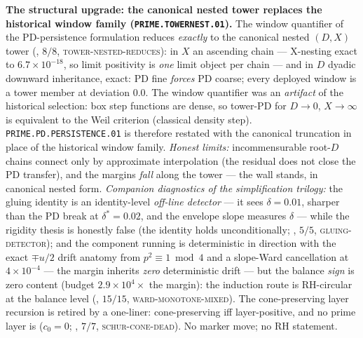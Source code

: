\par\smallskip\noindent\textbf{The structural upgrade: the canonical
nested tower replaces the historical window family
(\texttt{PRIME.TOWERNEST.01}).}
The window quantifier of the PD-persistence formulation reduces
\emph{exactly} to the canonical nested $(D,X)$ tower
(, $8/8$,
\textsc{tower-nested-reduces}): in $X$ an ascending chain ---
X-nesting exact to $6.7\times10^{-18}$, so limit positivity is
\emph{one} limit object per chain --- and in $D$ dyadic downward
inheritance, exact: PD fine \emph{forces} PD coarse; every deployed
window is a tower member at deviation $0.0$.  The window quantifier
was an \emph{artifact} of the historical selection: box step
functions are dense, so tower-PD for $D\to0$, $X\to\infty$ is
equivalent to the Weil criterion (classical density step).
\texttt{PRIME.PD.PERSISTENCE.01} is therefore restated with the
canonical truncation in place of the historical window family.
\emph{Honest limits:} incommensurable root-$D$ chains connect only
by approximate interpolation (the residual does not close the PD
transfer), and the margins \emph{fall} along the tower --- the wall
stands, in canonical nested form.  \emph{Companion diagnostics of
the simplification trilogy:} the gluing identity is an
identity-level \emph{off-line detector} --- it sees $\delta=0.01$,
sharper than the PD break at $\delta^*=0.02$, and the envelope slope
measures $\delta$ --- while the rigidity thesis is honestly false
(the identity holds unconditionally;
, $5/5$, \textsc{gluing-detector});
and the component running is deterministic in direction with the
exact $\mp u/2$ drift anatomy from $p^2\equiv1\bmod4$ and a
slope-Ward cancellation at $4\times10^{-4}$ --- the margin inherits
\emph{zero} deterministic drift --- but the balance \emph{sign} is
zero content (budget $2.9\times10^4\times$ the margin): the
induction route is RH-circular at the balance level
(, $15/15$,
\textsc{ward-monotone-mixed}).  The cone-preserving layer recursion
is retired by a one-liner: cone-preserving iff layer-positive, and
no prime layer is ($c_0=0$;
, $7/7$,
\textsc{schur-cone-dead}).  No marker move; no RH statement.



